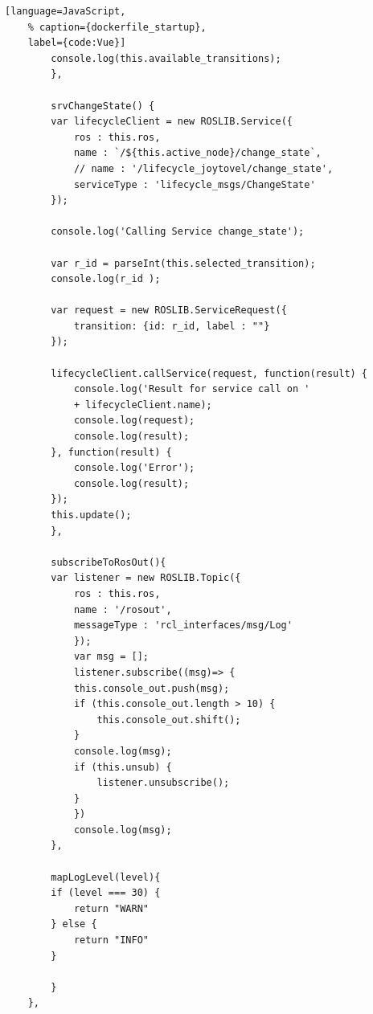 \begin{lstlisting}[language=JavaScript,
	% caption={dockerfile_startup}, 
	label={code:Vue}]
		console.log(this.available_transitions);
		},

		srvChangeState() {
		var lifecycleClient = new ROSLIB.Service({
			ros : this.ros,
			name : `/${this.active_node}/change_state`,
			// name : '/lifecycle_joytovel/change_state', 
			serviceType : 'lifecycle_msgs/ChangeState'
		});

		console.log('Calling Service change_state');
	
		var r_id = parseInt(this.selected_transition);
		console.log(r_id );

		var request = new ROSLIB.ServiceRequest({
			transition: {id: r_id, label : ""}
		});

		lifecycleClient.callService(request, function(result) {
			console.log('Result for service call on '
			+ lifecycleClient.name);
			console.log(request);
			console.log(result);
		}, function(result) {
			console.log('Error');
			console.log(result);
		});
		this.update();
		},

		subscribeToRosOut(){
		var listener = new ROSLIB.Topic({
			ros : this.ros,
			name : '/rosout',
			messageType : 'rcl_interfaces/msg/Log'
			});
			var msg = [];
			listener.subscribe((msg)=> {
			this.console_out.push(msg);
			if (this.console_out.length > 10) {
				this.console_out.shift();
			}
			console.log(msg);
			if (this.unsub) {
				listener.unsubscribe();
			}
			}) 
			console.log(msg);
		},

		mapLogLevel(level){
		if (level === 30) {
			return "WARN"
		} else {
			return "INFO"
		}

		}
	},
\end{lstlisting}

